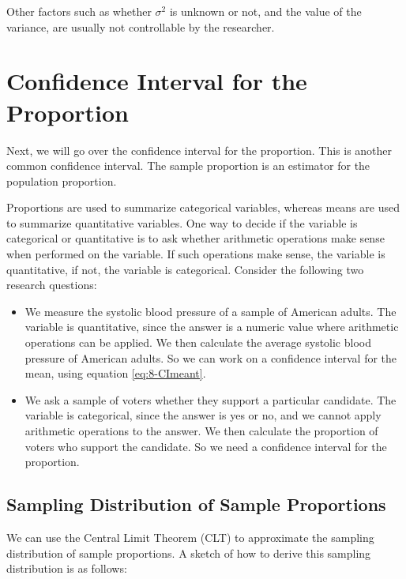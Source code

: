 \documentclass[
]{book}
\begin{document}
Other factors such as whether \(\sigma^2\) is unknown or not, and the value of the variance, are usually not controllable by the researcher.

\section{Confidence Interval for the Proportion}\label{confidence-interval-for-the-proportion}

Next, we will go over the confidence interval for the proportion. This is another common confidence interval. The sample proportion is an estimator for the population proportion.

Proportions are used to summarize categorical variables, whereas means are used to summarize quantitative variables. One way to decide if the variable is categorical or quantitative is to ask whether arithmetic operations make sense when performed on the variable. If such operations make sense, the variable is quantitative, if not, the variable is categorical. Consider the following two research questions:

\begin{itemize}
\item
  We measure the systolic blood pressure of a sample of American adults. The variable is quantitative, since the answer is a numeric value where arithmetic operations can be applied. We then calculate the average systolic blood pressure of American adults. So we can work on a confidence interval for the mean, using equation \eqref{eq:8-CImeant}.
\item
  We ask a sample of voters whether they support a particular candidate. The variable is categorical, since the answer is yes or no, and we cannot apply arithmetic operations to the answer. We then calculate the proportion of voters who support the candidate. So we need a confidence interval for the proportion.
\end{itemize}

\subsection{Sampling Distribution of Sample Proportions}\label{sampdistprops}

We can use the Central Limit Theorem (CLT) to approximate the sampling distribution of sample proportions. A sketch of how to derive this sampling distribution is as follows:
\end{document}
